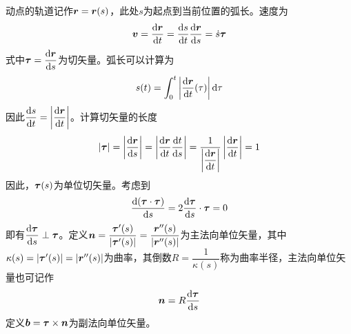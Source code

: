 动点的轨道记作$\boldsymbol{r} = \boldsymbol{r} (s)$，此处$s$为起点到当前位置的弧长。速度为
\begin{equation}
	\boldsymbol{v} = \frac{\mathrm{d} \boldsymbol{r}}{\mathrm{d} t} = \frac{\mathrm{d} s}{\mathrm{d} t} \frac{\mathrm{d} \boldsymbol{r}}{\mathrm{d} s} = \dot{s} \boldsymbol{\tau}
\end{equation}
式中$\boldsymbol{\tau} = \dfrac{\mathrm{d} \boldsymbol{r}}{\mathrm{d} s}$为切矢量。弧长可以计算为
\begin{equation}
	s(t) = \int_0^t \left|\frac{\mathrm{d} \boldsymbol{r}}{\mathrm{d} t}(\tau) \right| \mathrm{d}\tau
\end{equation}
因此$\dfrac{\mathrm{d} s}{\mathrm{d} t} = \left|\dfrac{\mathrm{d} \boldsymbol{r}}{\mathrm{d} t}\right|$。计算切矢量的长度
\begin{equation*}
	|\boldsymbol{\tau}| = \left|\frac{\mathrm{d} \boldsymbol{r}}{\mathrm{d} s}\right| = \left|\dfrac{\mathrm{d} \boldsymbol{r}}{\mathrm{d} t} \dfrac{\mathrm{d} t}{\mathrm{d} s}\right| = \frac{1}{\left|\dfrac{\mathrm{d} \boldsymbol{r}}{\mathrm{d} t}\right|} \left|\dfrac{\mathrm{d} \boldsymbol{r}}{\mathrm{d} t}\right| = 1
\end{equation*}
因此，$\boldsymbol{\tau}(s)$为单位切矢量。考虑到
\begin{equation*}
	\frac{\mathrm{d} (\boldsymbol{\tau} \cdot \boldsymbol{\tau})}{\mathrm{d} s} = 2 \frac{\mathrm{d} \boldsymbol{\tau}}{\mathrm{d} s} \cdot \boldsymbol{\tau} = 0
\end{equation*}
即有$\dfrac{\mathrm{d} \boldsymbol{\tau}}{\mathrm{d} s} \perp \boldsymbol{\tau}$。定义$\boldsymbol{n} = \dfrac{\boldsymbol{\tau}'(s)}{|\boldsymbol{\tau}'(s)|} = \dfrac{\boldsymbol{r}''(s)}{|\boldsymbol{r}''(s)|}$为主法向单位矢量，其中$\kappa(s) = |\boldsymbol{\tau}'(s)| = |\boldsymbol{r}''(s)|$为曲率，其倒数$R = \dfrac{1}{\kappa(s)}$称为曲率半径，主法向单位矢量也可记作
\begin{equation}
	\boldsymbol{n} = R\frac{\mathrm{d} \boldsymbol{\tau}}{\mathrm{d} s}
\end{equation}
定义$\boldsymbol{b} = \boldsymbol{\tau} \times \boldsymbol{n}$为副法向单位矢量。

